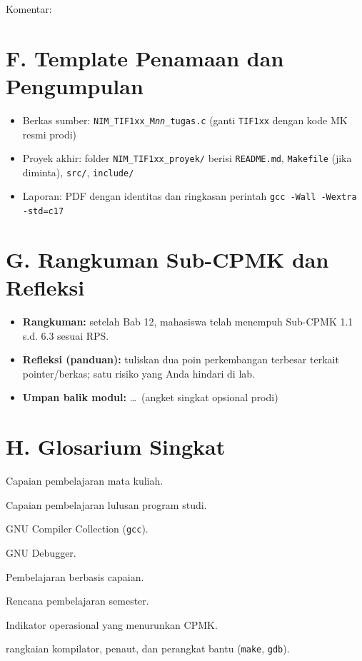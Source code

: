 \noindent Komentar: \hrulefill

\section*{F. Template Penamaan dan Pengumpulan}

\begin{itemize}[leftmargin=*]
  \item Berkas sumber: \texttt{NIM\_TIF1xx\_M\textit{nn}\_tugas.c} (ganti \texttt{TIF1xx} dengan kode MK resmi prodi)
  \item Proyek akhir: folder \texttt{NIM\_TIF1xx\_proyek/} berisi \texttt{README.md}, \texttt{Makefile} (jika diminta), \texttt{src/}, \texttt{include/}
  \item Laporan: PDF dengan identitas dan ringkasan perintah \texttt{gcc -Wall -Wextra -std=c17}
\end{itemize}

\section*{G. Rangkuman Sub-CPMK dan Refleksi}

\begin{itemize}[leftmargin=*]
  \item \textbf{Rangkuman:} setelah Bab 12, mahasiswa telah menempuh Sub-CPMK 1.1 s.d. 6.3 sesuai RPS.
  \item \textbf{Refleksi (panduan):} tuliskan dua poin perkembangan terbesar terkait pointer/berkas; satu risiko yang Anda hindari di lab.
  \item \textbf{Umpan balik modul:} \ldots\ (angket singkat opsional prodi)
\end{itemize}

\section*{H. Glosarium Singkat}

\begin{description}[style=nextline, widest=Sub-CPMK:, itemsep=0.25em]
  \item[CPMK:] Capaian pembelajaran mata kuliah.
  \item[CPL:] Capaian pembelajaran lulusan program studi.
  \item[GCC:] GNU Compiler Collection (\texttt{gcc}).
  \item[GDB:] GNU Debugger.
  \item[OBE:] Pembelajaran berbasis capaian.
  \item[RPS:] Rencana pembelajaran semester.
  \item[Sub-CPMK:] Indikator operasional yang menurunkan CPMK.
  \item[Toolchain:] rangkaian kompilator, penaut, dan perangkat bantu (\texttt{make}, \texttt{gdb}).
\end{description}
